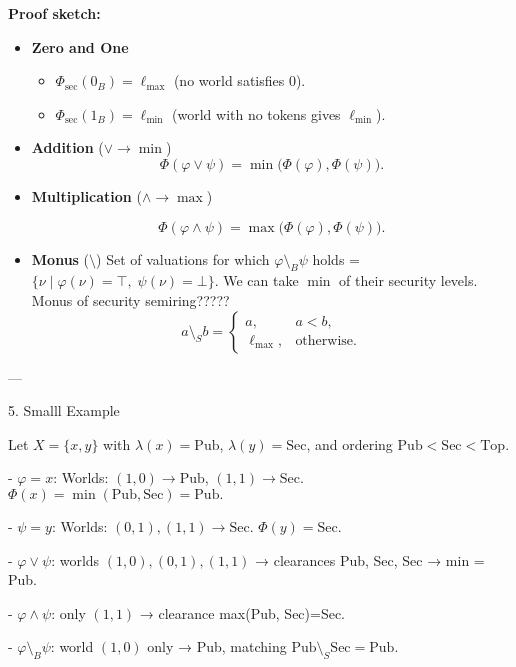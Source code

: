 \textbf{Proof sketch:}
\begin{itemize}
    \item \textbf{Zero and One}  
        \begin{itemize}
            \item \(\Phi_{\mathrm{sec}}(0_B)=\ell_{\max}\) (no world satisfies 0).
            \item \(\Phi_{\mathrm{sec}}(1_B)=\ell_{\min}\) (world with no tokens gives \(\ell_{\min}\)).
        \end{itemize}
    \item \textbf{Addition} (\(\vee \to \min\))  
        \[
            \Phi(\varphi\vee\psi)
            = \min\bigl(\Phi(\varphi),\Phi(\psi)\bigr).
        \]
    \item \textbf{Multiplication} (\(\wedge \to \max\))  
        
        \[
            \Phi(\varphi\wedge\psi)
            = \max\bigl(\Phi(\varphi),\Phi(\psi)\bigr).
        \]
    \item \textbf{Monus} (\(\setminus\))  
        Set of valuations for which  \(\varphi\setminus_B\psi\) holds =  
        \(\{\nu \mid \varphi(\nu)=\top,\;\psi(\nu)=\bot\}\).  
        We can take \(\min\) of their security levels.
        Monus of security semiring?????
        \[
            a\setminus_S b =
            \begin{cases}
                a, & a<b,\\
                \ell_{\max}, &\text{otherwise}.
            \end{cases}
        \]
\end{itemize}

---

 5. Smalll Example

Let \(X=\{x,y\}\) with \(\lambda(x)=\mathrm{Pub}\), \(\lambda(y)=\mathrm{Sec}\),
and ordering \(\mathrm{Pub}<\mathrm{Sec}<\mathrm{Top}\).

- \(\varphi = x\):  
  Worlds: \((1,0)\to\mathrm{Pub}\), \((1,1)\to\mathrm{Sec}\).  
  \(\Phi(x)=\min(\mathrm{Pub},\mathrm{Sec})=\mathrm{Pub}.\)

- \(\psi = y\):  
  Worlds: \((0,1),(1,1)\to\mathrm{Sec}\).  
  \(\Phi(y)=\mathrm{Sec}.\)

- \(\varphi\vee\psi\): worlds \((1,0),(0,1),(1,1)\) → clearances Pub, Sec, Sec → min = Pub.

- \(\varphi\wedge\psi\): only \((1,1)\) → clearance max(Pub, Sec)=Sec.

- \(\varphi\setminus_B\psi\): world \((1,0)\) only → Pub, matching \(\mathrm{Pub}\setminus_S\mathrm{Sec}=\mathrm{Pub}.\)


